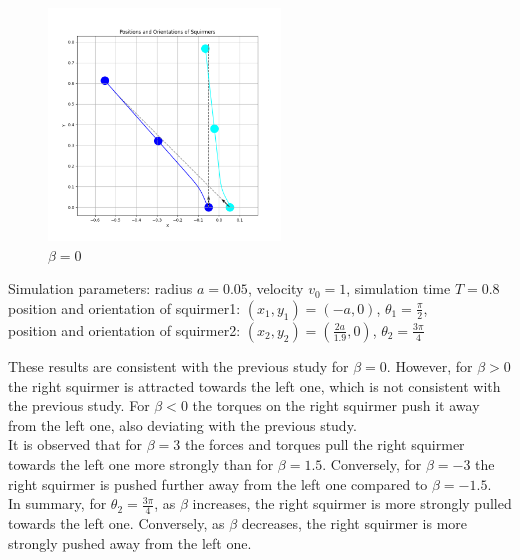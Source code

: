 \documentclass{article}
\begin{document}
\begin{figure}[H]
    \centering
    \includegraphics[width=0.55\textwidth]{graphs/simulations/sim_sq_sq/beta0/3pi_4_.png}
    \caption{\footnotesize $\beta = 0$}
\end{figure}
\begin{center}
    Simulation parameters: radius $a=0.05$, velocity $v_0=1$, simulation time $T=0.8$\\
        position and orientation of squirmer1: $(x_1,y_1)=(-a,0)$, $\theta_1=\frac{\pi}{2}$,\\
        position and orientation of squirmer2: $(x_2,y_2)=(\frac{2a}{1.9},0)$, $\theta_2=\frac{3\pi}{4}$
\end{center}
These results are consistent with the previous study\cite{Stark} for $\beta = 0$. However, for $\beta > 0$ the right 
squirmer is attracted towards the left one,
 which is not consistent with the previous study. For $\beta < 0$ the torques on the right squirmer push
it away from the left one, also deviating with the previous study.\\
It is observed that for $\beta = 3$ the forces and torques pull the right squirmer towards the left one more strongly than for $\beta=1.5$.
Conversely, for $\beta = -3$ the right squirmer is pushed further away from the left one compared to $\beta = -1.5$.\\
In summary, for $\theta_2 = \frac{3\pi}{4}$, as $\beta$ increases, the right squirmer is more strongly pulled towards the left one. Conversely, as
$\beta$ decreases, the right squirmer is more strongly pushed away from the left one.
\end{document}
